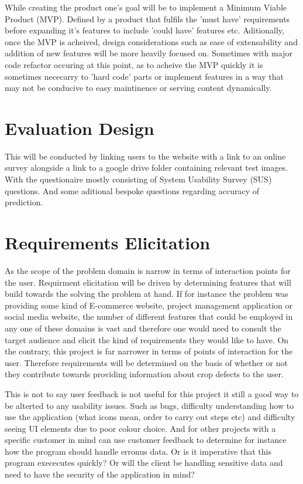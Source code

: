 While creating the product one's goal will be to implement a Minimum Viable Product (MVP). Defined by a product that fulfils the 'must have' requirements before expanding it's features to include 'could have' features etc. Aditionally, once the MVP is acheived, design considerations such as ease of extensability and addition of new features will be more heavily focused on. Sometimes with major code refactor occuring at this point, as to acheive the MVP quickly it is sometimes nececarry to 'hard code' parts or implement features in a way that may not be conducive to easy maintinence or serving content dynamically.

\section{Evaluation Design}
  This will be conducted by linking users to the website with a link to an online survey alongside a link to a google drive folder containing relevant test images. With the questionaire mostly consisting of System Usability Survey (SUS) questions. And some aditional bespoke questions regarding accuracy of prediction.
\section{Requirements Elicitation}
  As the scope of the problem domain is narrow in terms of interaction points for the user. Requirment elicitation will be driven by determining features that will build towards the solving the problem at hand. If for instance the problem was providing some kind of E-commerce website, project management application or social media website, the number of different features that could be employed in any one of these domains is vast and therefore one would need to consult the target audience and elicit the kind of requirements they would like to have. On the contrary, this project is far narrower in terms of points of interaction for the user. Therefore requirements will be determined on the basis of whether or not they contribute towards providing information about crop defects to the user.
  \par
  This is not to say user feedback is not useful for this project it still a good way to be alterted to any usability issues. Such as bugs, difficulty understanding how to use the application (what icons mean, order to carry out steps etc) and difficulty seeing UI elements due to poor colour choice. And for other projects with a specific customer in mind can use customer feedback to determine for instance how the program should handle erronus data. Or is it imperative that this program exececutes quickly? Or will the client be handling sensitive data and need to have the security of the application in mind?

